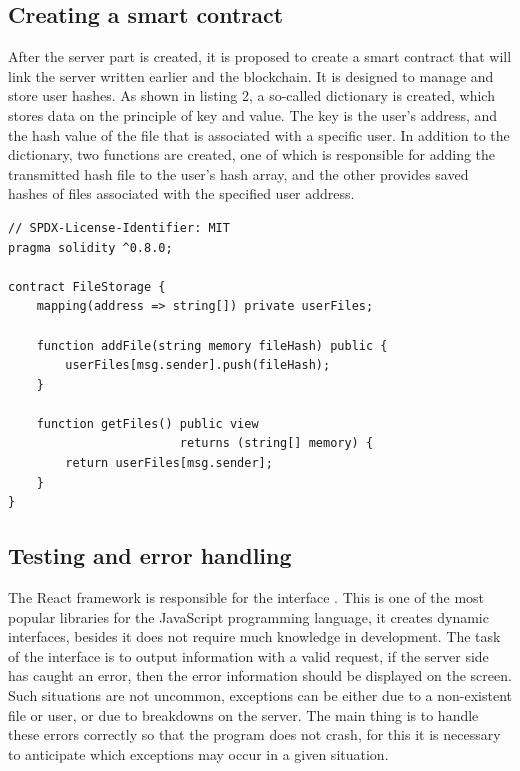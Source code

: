 \documentclass[10pt,conference,a4paper]{IEEEtran_EDM}
\begin{document}
\subsection{Creating a smart contract}
After the server part is created, it is proposed to create a smart contract that will link the server written earlier and the blockchain. It is designed to manage and store user hashes. As shown in listing 2, a so-called dictionary is created, which stores data on the principle of key and value. The key is the user's address, and the hash value of the file that is associated with a specific user. In addition to the dictionary, two functions are created, one of which is responsible for adding the transmitted hash file to the user's hash array, and the other provides saved hashes of files associated with the specified user address.


\begin{lstlisting}[caption=Solidity code for a smart contract]
// SPDX-License-Identifier: MIT
pragma solidity ^0.8.0;

contract FileStorage {
    mapping(address => string[]) private userFiles;

    function addFile(string memory fileHash) public {
        userFiles[msg.sender].push(fileHash);
    }

    function getFiles() public view
                        returns (string[] memory) {
        return userFiles[msg.sender];
    }
}
\end{lstlisting}

\subsection{Testing and error handling}

The React framework is responsible for the interface \cite{Greg Lim}. This is one of the most popular libraries for the JavaScript programming language, it creates dynamic interfaces, besides it does not require much knowledge in development. The task of the interface is to output information with a valid request, if the server side has caught an error, then the error information should be displayed on the screen. Such situations are not uncommon, exceptions can be either due to a non-existent file or user, or due to breakdowns on the server. The main thing is to handle these errors correctly so that the program does not crash, for this it is necessary to anticipate which exceptions may occur in a given situation.
\end{document}
